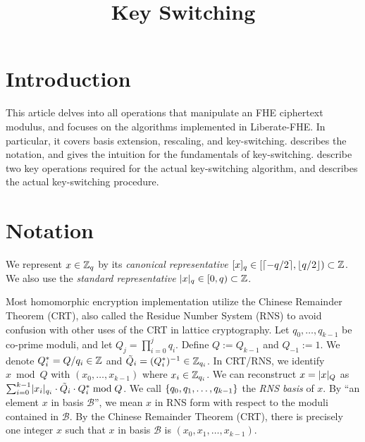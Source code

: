 \documentclass[../fheimpl.tex]{subfiles}
\begin{document}
	\newif\ifksismain
	\ifcompileasbook
	\else
		\title{Key Switching}
		\hypersetup{pageanchor=false}
		\ksismaintrue 
		\maketitle
		\listoffixmes
		\tableofcontents
		\compileasbooktrue
		\hypersetup{pageanchor=true}
	\fi

    \section{Introduction}
    This article delves into all operations that manipulate an FHE ciphertext modulus, and focuses on the algorithms implemented in Liberate-FHE. In particular, it covers basis extension, rescaling, and key-switching.  describes the notation, and  gives the intuition for the fundamentals of key-switching.  describe two key operations required for the actual key-switching algorithm, and  describes the actual key-switching procedure.
    
    \section{Notation}
    \label{sec:notation}
    We represent $x\in \mathbb{Z}_q$ by its \emph{canonical representative} $[x]_q \in [\lceil-q/2\rceil, \lfloor q/2\rfloor)\subset\mathbb{Z}$. We also use the \emph{standard representative} $\lvert x\rvert_q \in [0, q)\subset\mathbb{Z}$.
    
    Most homomorphic encryption implementation utilize the Chinese Remainder Theorem (CRT), also called the Residue Number System (RNS) to avoid confusion with other uses of the CRT in lattice cryptography. Let $q_0, \ldots, q_{k-1}$ be co-prime moduli, and let $Q_j=\prod_{i=0}^j q_i$. Define $Q:=Q_{k-1}$ and $Q_{-1}:=1$. We denote $Q_i^* = Q/q_i\in \mathbb{Z}$ and $\tilde{Q}_i=(Q_i^*)^{-1}  \in \mathbb{Z}_{q_i}$. In CRT/RNS, we identify $x\bmod Q$ with $(x_0, \ldots, x_{k-1})$ where $x_i\in\mathbb{Z}_{q_i}$. We can reconstruct $x=\lvert x\rvert_Q$ as $\sum_{i=0}^{k-1}\lvert x_i\rvert_{q_i}\cdot \tilde{Q}_i\cdot Q_i^* \bmod Q$. We call $\{q_0, q_1,\ldots, q_{k-1}\}$ the \emph{RNS basis} of $x$. By ``an element $x$ in basis $\mathcal{B}$'', we mean $x$ in RNS form with respect to the moduli contained in $\mathcal{B}$. By the Chinese Remainder Theorem (CRT), there is precisely one integer $x$ such that $x$ in basis $\mathcal{B}$ is $(x_0, x_1, \ldots, x_{k-1})$. 
    
    
    
    
    
    
    
    
	\ifksismain
		 \appendix
		 
		 \printbibliography
	\fi
\end{document}
